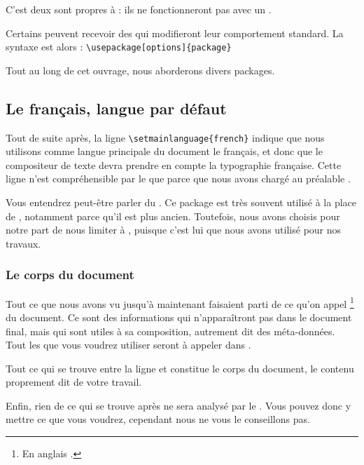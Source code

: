 C'est deux  sont propres à  : ils ne fonctionneront pas avec un  \logicile{\LaTex}.

Certains  peuvent recevoir des  qui modifieront leur comportement standard. La syntaxe est alors : \verb|\usepackage[options]{package}|

Tout au long de cet ouvrage, nous aborderons divers packages.

\subsection{Le fran\c cais, langue par défaut}

Tout de suite après, la ligne \verb|\setmainlanguage{french}| indique que nous utilisons comme langue principale du document le fran\c cais, et donc que le compositeur de texte devra prendre en compte la typographie fran\c caise. Cette ligne n'est compréhensible par le  que parce que nous avons chargé au préalable .

\begin{anedocte}
Vous entendrez peut-être parler du  . Ce package est très souvent utilisé à la place de , notamment parce qu'il est plus ancien. Toutefois, nous avons choisis pour notre part de nous limiter à , puisque c'est lui que nous avons utilisé pour nos travaux.


\end{anedocte}

\subsubsection{Le corps du document}

Tout ce que nous avons vu jusqu'à maintenant faisaient parti de ce qu'on appel \footnote{En anglais .} du document. Ce sont des informations qui n'apparaîtront pas dans le document final, mais qui sont utiles à sa composition, autrement dit des méta-données. Tout les  que vous voudrez utiliser seront à appeler dans .

Tout ce qui se trouve entre la ligne \verb|| et \verb|| constitue le corps du document, le contenu proprement dit de votre travail.

Enfin, rien de ce qui se trouve après \verb|| ne sera analysé par le . Vous pouvez donc y mettre ce que vous voudrez, cependant nous ne vous le conseillons pas.

